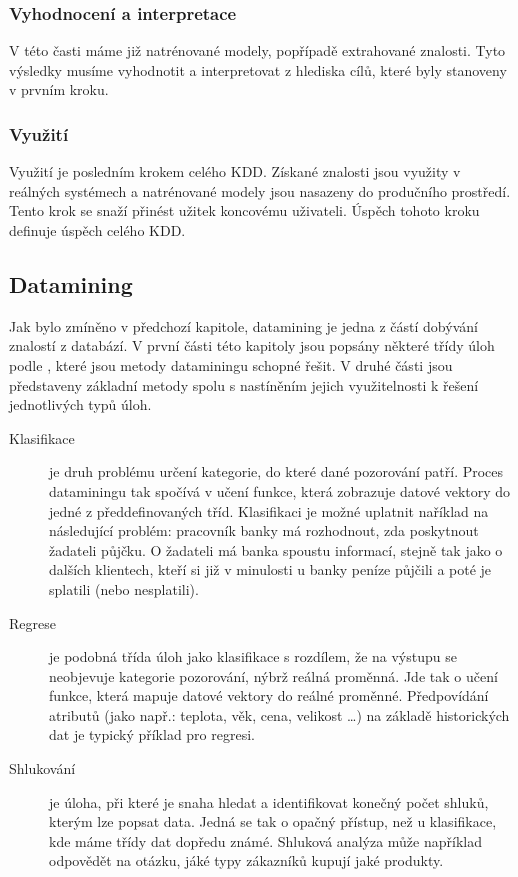 \documentclass[thesis=M,czech]{FITthesis}[2012/06/26]
\begin{document}
\subsubsection*{Vyhodnocení a interpretace}
V této časti máme již natrénované modely, popřípadě extrahované znalosti. Tyto výsledky musíme vyhodnotit a interpretovat z hlediska cílů, které byly stanoveny v prvním kroku.

\subsubsection*{Využití}
Využití je posledním krokem celého KDD. Získané znalosti jsou využity v reálných systémech a natrénované modely jsou nasazeny do produčního prostředí. Tento krok se snaží přinést užitek koncovému uživateli. Úspěch tohoto kroku definuje úspěch celého KDD.	
	

\subsection{Datamining}
Jak bylo zmíněno v předchozí kapitole, datamining je jedna z částí dobývání znalostí z databází. V první části této kapitoly jsou popsány některé třídy úloh podle \cite{fayyad}, které jsou metody dataminingu schopné řešit. V druhé části jsou představeny základní metody spolu s nastíněním jejich využitelnosti k řešení jednotlivých typů úloh. 

\begin{description}
    \item[Klasifikace]
    
    je druh problému určení kategorie, do které dané pozorování patří. Proces dataminingu tak spočívá v učení funkce, která zobrazuje datové vektory do jedné z předdefinovaných tříd. Klasifikaci je možné uplatnit naříklad na následující problém: pracovník 
    banky má rozhodnout, zda poskytnout žadateli půjčku. O žadateli má banka spoustu informací, stejně tak jako o dalších klientech, kteří si již v minulosti u banky peníze půjčili a poté je splatili (nebo nesplatili).
    
    
    \item[Regrese]
    
    je podobná třída úloh jako klasifikace s rozdílem, že na výstupu se neobjevuje kategorie pozorování, nýbrž reálná proměnná. Jde tak o učení funkce, která mapuje datové vektory do reálné proměnné. Předpovídání atributů (jako např.: teplota, věk, cena, velikost \dots) na základě historických dat je typický příklad pro regresi.
    

   \item[Shlukování]
   
   je úloha, při které je snaha hledat a identifikovat konečný počet shluků, kterým lze popsat data. Jedná se tak o opačný přístup, než u klasifikace, kde máme třídy dat dopředu známé. Shluková analýza může například odpovědět na otázku, jáké typy zákazníků kupují jaké produkty.
   
\end{description}
\end{document}
